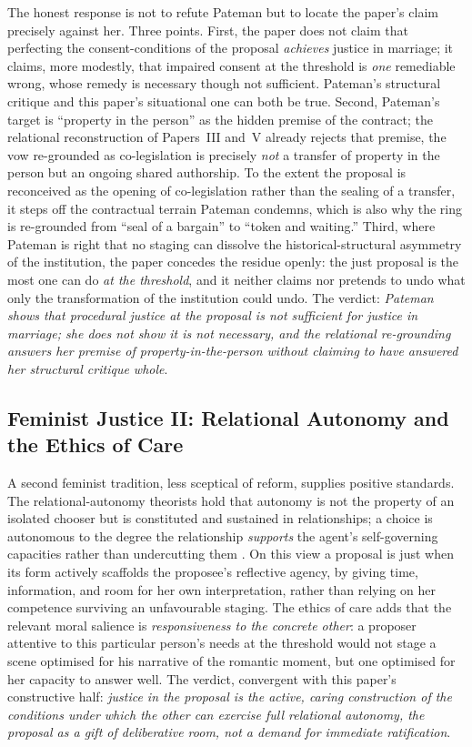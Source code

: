 \documentclass[11pt,a4paper]{article}
\begin{document}
The honest response is not to refute Pateman but to locate the paper's claim precisely against her. Three points. First, the paper does not claim that perfecting the consent-conditions of the proposal \emph{achieves} justice in marriage; it claims, more modestly, that impaired consent at the threshold is \emph{one} remediable wrong, whose remedy is necessary though not sufficient. Pateman's structural critique and this paper's situational one can both be true. Second, Pateman's target is ``property in the person'' as the hidden premise of the contract; the relational reconstruction of Papers~III and~V already rejects that premise, the vow re-grounded as co-legislation is precisely \emph{not} a transfer of property in the person but an ongoing shared authorship. To the extent the proposal is reconceived as the opening of co-legislation rather than the sealing of a transfer, it steps off the contractual terrain Pateman condemns, which is also why the ring is re-grounded from ``seal of a bargain'' to ``token and waiting.'' Third, where Pateman is right that no staging can dissolve the historical-structural asymmetry of the institution, the paper concedes the residue openly: the just proposal is the most one can do \emph{at the threshold}, and it neither claims nor pretends to undo what only the transformation of the institution could undo. The verdict: \emph{Pateman shows that procedural justice at the proposal is not sufficient for justice in marriage; she does not show it is not necessary, and the relational re-grounding answers her premise of property-in-the-person without claiming to have answered her structural critique whole}.

\subsection{Feminist Justice II: Relational Autonomy and the Ethics of Care}

A second feminist tradition, less sceptical of reform, supplies positive standards. The relational-autonomy theorists hold that autonomy is not the property of an isolated chooser but is constituted and sustained in relationships; a choice is autonomous to the degree the relationship \emph{supports} the agent's self-governing capacities rather than undercutting them \parencite{mackenzie2000relational}. On this view a proposal is just when its form actively scaffolds the proposee's reflective agency, by giving time, information, and room for her own interpretation, rather than relying on her competence surviving an unfavourable staging. The ethics of care adds that the relevant moral salience is \emph{responsiveness to the concrete other}: a proposer attentive to this particular person's needs at the threshold would not stage a scene optimised for his narrative of the romantic moment, but one optimised for her capacity to answer well. The verdict, convergent with this paper's constructive half: \emph{justice in the proposal is the active, caring construction of the conditions under which the other can exercise full relational autonomy, the proposal as a gift of deliberative room, not a demand for immediate ratification}.
\end{document}
